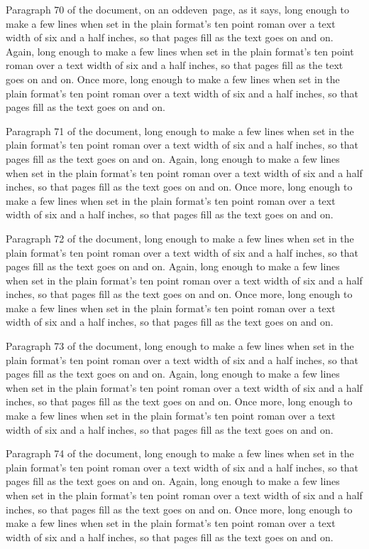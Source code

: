 Paragraph 70 of the document, \edef\thisboxb{\number{}}on an \ifodd\thisboxb odd\else even\fi\ page, as it says, long enough to make a few lines when set in the plain format's ten point roman over a text width of six and a half inches, so that pages fill as the text goes on and on. Again, long enough to make a few lines when set in the plain format's ten point roman over a text width of six and a half inches, so that pages fill as the text goes on and on. Once more, long enough to make a few lines when set in the plain format's ten point roman over a text width of six and a half inches, so that pages fill as the text goes on and on.

Paragraph 71 of the document, long enough to make a few lines when set in the plain format's ten point roman over a text width of six and a half inches, so that pages fill as the text goes on and on. Again, long enough to make a few lines when set in the plain format's ten point roman over a text width of six and a half inches, so that pages fill as the text goes on and on. Once more, long enough to make a few lines when set in the plain format's ten point roman over a text width of six and a half inches, so that pages fill as the text goes on and on.

Paragraph 72 of the document, long enough to make a few lines when set in the plain format's ten point roman over a text width of six and a half inches, so that pages fill as the text goes on and on. Again, long enough to make a few lines when set in the plain format's ten point roman over a text width of six and a half inches, so that pages fill as the text goes on and on. Once more, long enough to make a few lines when set in the plain format's ten point roman over a text width of six and a half inches, so that pages fill as the text goes on and on.

Paragraph 73 of the document, long enough to make a few lines when set in the plain format's ten point roman over a text width of six and a half inches, so that pages fill as the text goes on and on. Again, long enough to make a few lines when set in the plain format's ten point roman over a text width of six and a half inches, so that pages fill as the text goes on and on. Once more, long enough to make a few lines when set in the plain format's ten point roman over a text width of six and a half inches, so that pages fill as the text goes on and on.

Paragraph 74 of the document, long enough to make a few lines when set in the plain format's ten point roman over a text width of six and a half inches, so that pages fill as the text goes on and on. Again, long enough to make a few lines when set in the plain format's ten point roman over a text width of six and a half inches, so that pages fill as the text goes on and on. Once more, long enough to make a few lines when set in the plain format's ten point roman over a text width of six and a half inches, so that pages fill as the text goes on and on.


